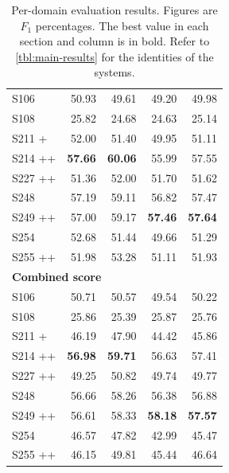 \documentclass[11pt,letterpaper]{article}
\begin{document}
\begin{table}
\begin{tabular}{lr<{\hspace{10pt}}rr<{\hspace{10pt}}r}
S106       &           50.93  &          49.61  &         49.20  &      49.98 \\
S108       &           25.82  &          24.68  &         24.63  &      25.14 \\
S211 +     &           52.00  &          51.40  &         49.95  &      51.11 \\
S214 ++    &   \textbf{57.66} &  \textbf{60.06} &         55.99  &      57.55 \\
S227 ++    &           51.36  &          52.00  &         51.70  &      51.62 \\
S248       &           57.19  &          59.11  &         56.82  &      57.47 \\
S249 ++    &           57.00  &          59.17  & \textbf{57.46} &  \textbf{57.64} \\
S254       &           52.68  &          51.44  &         49.66  &      51.29 \\
S255 ++    &           51.98  &          53.28  &         51.11  &      51.93 \\[1.4ex]

\multicolumn{5}{l}{\textbf{Combined score}} \\

S106       &   50.71 &  50.57 &   49.54 &      50.22 \\
S108       &   25.86 &  25.39 &   25.87 &      25.76 \\
S211 +     &   46.19 &  47.90 &   44.42 &      45.86 \\
S214 ++    &   \textbf{56.98} &  \textbf{59.71} &   56.63 &      57.41 \\
S227 ++    &   49.25 &  50.82 &   49.74 &      49.77 \\
S248       &   56.66 &  58.26 &   56.38 &      56.88 \\
S249 ++    &   56.61 &  58.33 &   \textbf{58.18} &      \textbf{57.57} \\
S254       &   46.57 &  47.82 &   42.99 &      45.47 \\
S255 ++    &   46.15 &  49.81 &   45.44 &      46.64 \\


\end{tabular}

\caption{Per-domain evaluation results. Figures are $F_1$ percentages.
The best value in each section and column is in bold.
Refer to \cref{tbl:main-results} for the identities of the systems.}	
\label{tbl:per-domain-results}
\end{table}



\setlength{\bibsep}{10pt}
{\fontsize{10}{12.25}\selectfont
}
\end{document}
